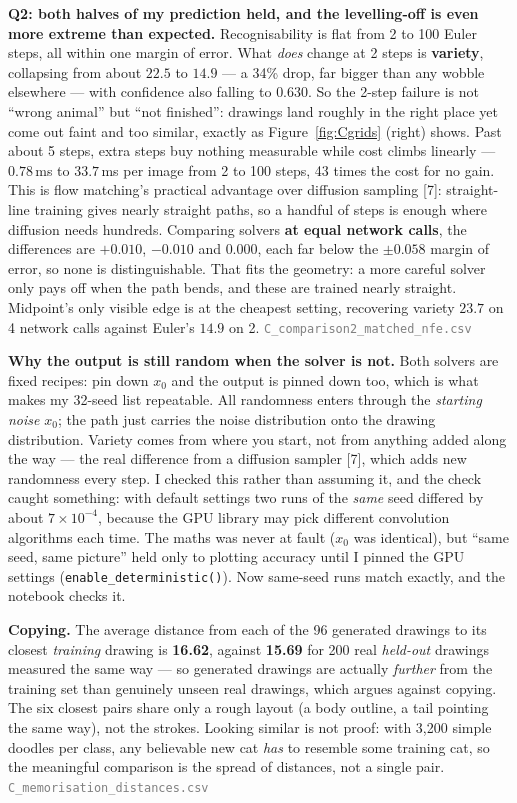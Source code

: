 \documentclass[12pt,a4paper]{article}
\newcommand{\file}[1]{\textcolor{gray}{\small\texttt{#1}}}
\begin{document}
\textbf{Q2: both halves of my prediction held, and the levelling-off is even more extreme than expected.}
Recognisability is flat from 2 to 100 Euler steps, all within one margin of error. What \emph{does} change
at 2 steps is \textbf{variety}, collapsing from about $22.5$ to $\mathbf{14.9}$ --- a 34\% drop, far
bigger than any wobble elsewhere --- with confidence also falling to $0.630$. So the 2-step failure is not
``wrong animal'' but ``not finished'': drawings land roughly in the right place yet come out faint and too
similar, exactly as Figure~\ref{fig:Cgrids} (right) shows. Past about 5 steps, extra steps buy nothing
measurable while cost climbs linearly --- $0.78$\,ms to $33.7$\,ms per image from 2 to 100 steps, 43 times
the cost for no gain. This is flow matching's practical advantage over diffusion sampling [7]: straight-line
training gives nearly straight paths, so a handful of steps is enough where diffusion needs hundreds.
Comparing solvers \textbf{at equal network calls}, the differences are $+0.010$, $-0.010$ and $0.000$,
each far below the $\pm0.058$ margin of error, so none is distinguishable. That fits the geometry: a more
careful solver only pays off when the path bends, and these are trained nearly straight. Midpoint's only
visible edge is at the cheapest setting, recovering variety $23.7$ on 4 network calls against Euler's
$14.9$ on 2. \file{C\_comparison2\_matched\_nfe.csv}

\textbf{Why the output is still random when the solver is not.} Both solvers are fixed recipes: pin down
$x_0$ and the output is pinned down too, which is what makes my 32-seed list repeatable. All randomness
enters through the \emph{starting noise} $x_0$; the path just carries the noise distribution onto the
drawing distribution. Variety comes from where you start, not from anything added along the way --- the
real difference from a diffusion sampler [7], which adds new randomness every step. I checked this rather than
assuming it, and the check caught something: with default settings two runs of the \emph{same} seed differed by
about $7\times10^{-4}$, because the GPU library may pick different convolution algorithms each time. The maths
was never at fault ($x_0$ was identical), but ``same seed, same picture'' held only to plotting accuracy until I
pinned the GPU settings (\texttt{enable\_deterministic()}). Now same-seed runs match exactly, and the notebook
checks it.

\textbf{Copying.} The average distance from each of the 96 generated drawings to its closest
\emph{training} drawing is \textbf{16.62}, against \textbf{15.69} for 200 real \emph{held-out} drawings
measured the same way --- so generated drawings are actually \emph{further} from the training set than
genuinely unseen real drawings, which argues against copying. The six closest pairs share only a rough
layout (a body outline, a tail pointing the same way), not the strokes. Looking similar is not proof:
with 3{,}200 simple doodles per class, any believable new cat \emph{has} to resemble some training cat,
so the meaningful comparison is the spread of distances, not a single pair.
\file{C\_memorisation\_distances.csv}
\end{document}
